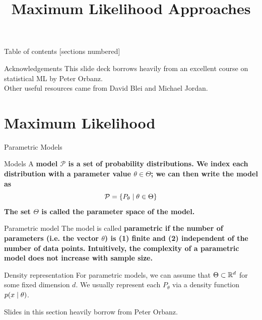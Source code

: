 \documentclass[10pt]{beamer}
\title{Maximum Likelihood Approaches}
\begin{document}
\maketitle

\begin{frame}{Table of contents}
  [sections numbered]
  \tableofcontents[hideallsubsections]
\end{frame}

\begin{frame}{Acknowledgements}
This slide deck borrows heavily from an excellent course on statistical ML by Peter Orbanz.  \\
\vfill
Other useful resources came from David Blei and Michael Jordan.
\end{frame}


\section{Maximum Likelihood}

\begin{frame}{Parametric Models}

\begin{sblock}{Models}
A \bf{model} $\mathcal{P}$ is a set of probability distributions.  We index each distribution with a parameter value $\theta \in \Theta$; we can then write the model as
\[ \mathcal{P} = \{ {P_\theta \; | \; \theta \in \Theta} \} \]
The set $\Theta$ is called the \bf{parameter space} of the model.
\end{sblock}

\begin{sblock}{Parametric model}
The model is called \bf{parametric} if the number of parameters (i.e. the vector $\theta$) is (1) finite and (2) independent of the number of data points.   Intuitively, the complexity of a parametric model does not increase with sample size.
\end{sblock}


\begin{sblock}{Density representation}
For parametric models, we can assume that $\Theta \subset \mathbb{R}^d$ for some fixed dimension $d$.   We usually represent each $P_\theta$ via a density function $p(x \; | \; \theta)$.
\end{sblock}
\hfill \tiny Slides in this section heavily borrow from Peter Orbanz.
\end{frame}
\end{document}
